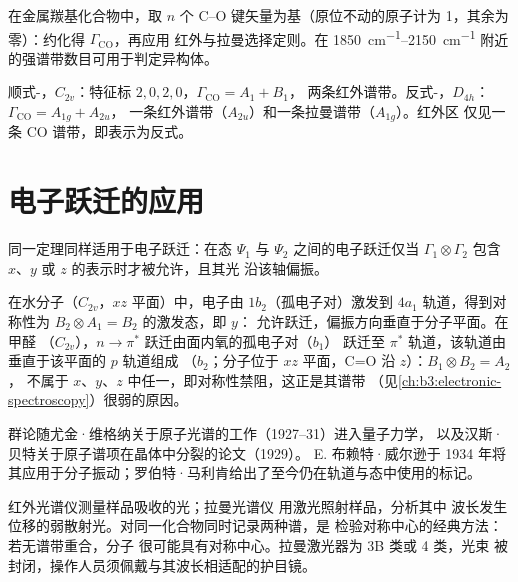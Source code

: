\begin{method}[计数 CO 伸缩振动]\label{met:b3:group-theory-applied:co-count}
在金属羰基化合物中，取 $n$ 个 C--O 键矢量为基（原位不动的原子计为
1，其余为零）：约化得 $\Gamma_{\mathrm{CO}}$，再应用
红外与拉曼选择定则。在
\qtyrange{1850}{2150}{cm^{-1}} 附近的强谱带数目可用于判定异构体。
\end{method}

\begin{example}[顺式与反式]\label{ex:b3:group-theory-applied:cis-trans}
顺式-，$C_{2v}$：特征标 $2, 0, 2, 0$，$\Gamma_{\mathrm{CO}} = A_1 + B_1$，
两条红外谱带。反式-，$D_{4h}$：$\Gamma_{\mathrm{CO}} = A_{1g} + A_{2u}$，
一条红外谱带（$A_{2u}$）和一条拉曼谱带（$A_{1g}$）。红外区
仅见一条 CO 谱带，即表示为反式。
\end{example}

\section{电子跃迁的应用}

同一定理同样适用于电子跃迁：在态
$\Psi_1$ 与 $\Psi_2$ 之间的电子跃迁仅当 $\Gamma_1\otimes\Gamma_2$
包含 $x$、$y$ 或 $z$ 的表示时才被允许，且其光
沿该轴偏振。

\begin{example}[水与甲醛的跃迁]\label{ex:b3:group-theory-applied:electronic}
在水分子（$C_{2v}$，$xz$ 平面）中，电子由 $1b_2$（孤电子对）激发到
$4a_1$ 轨道，得到对称性为 $B_2\otimes A_1 = B_2$ 的激发态，即 $y$：
允许跃迁，偏振方向垂直于分子平面。在甲醛
（$C_{2v}$），$n\to\pi^*$ 跃迁由面内氧的孤电子对（$b_1$）
跃迁至 $\pi^*$ 轨道，该轨道由垂直于该平面的 $p$ 轨道组成
（$b_2$；分子位于 $xz$ 平面，C=O 沿 $z$）：$B_1\otimes B_2 = A_2$，
不属于 $x$、$y$、$z$ 中任一，即对称性禁阻，这正是其谱带
（见\cref{ch:b3:electronic-spectroscopy}）很弱的原因。
\end{example}

\begin{history}
群论随尤金·维格纳关于原子光谱的工作（1927--31）进入量子力学，
以及汉斯·贝特关于原子谱项在晶体中分裂的论文（1929）。
E. 布赖特·威尔逊于
1934 年将其应用于分子振动；罗伯特·马利肯给出了至今仍在轨道与态中使用的标记。
\end{history}

\begin{inthelab}[红外与拉曼并排比较]
红外光谱仪测量样品吸收的光；拉曼光谱仪
用激光照射样品，分析其中
波长发生位移的弱散射光。对同一化合物同时记录两种谱，是
检验对称中心的经典方法：若无谱带重合，分子
很可能具有对称中心。拉曼激光器为 3B 类或 4 类，光束
被封闭，操作人员须佩戴与其波长相适配的护目镜。
\end{inthelab}

